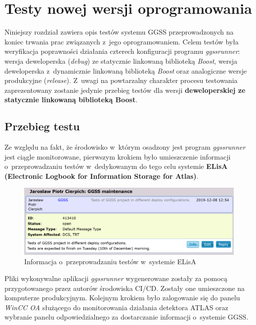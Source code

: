 \chapter{Testy nowej wersji oprogramowania}
\label{cha:test}
Niniejszy rozdział zawiera opis testów systemu GGSS przeprowadzonych na koniec trwania prac związanych z~jego oprogramowaniem. Celem testów była weryfikacja poprawności działania czterech konfiguracji programu \textit{ggssrunner}: wersja deweloperska (\textit{debug}) ze statycznie linkowaną biblioteką \textit{Boost}, wersja deweloperska z~dynamicznie linkowaną biblioteką \textit{Boost} oraz analogiczne wersje produkcyjne (\textit{release}). Z~uwagi na powtarzalny charakter procesu testowania zaprezentowany zostanie jedynie przebieg testów dla wersji \textbf{deweloperskiej ze statycznie linkowaną biblioteką Boost}. 

\section{Przebieg testu}
Ze względu na fakt, że środowisko w~którym osadzony jest program \textit{ggssrunner} jest ciągle monitorowane, pierwszym krokiem było umieszczenie informacji o~przeprowadzaniu testów w~dedykowanym do tego celu systemie \textbf{ELisA (Electronic Logbook for Information Storage for Atlas)}.

\begin{figure}[H]
\centering
\caption{Informacja o~przeprowadzaniu testów w~systemie ELisA}
\label{fig:elisa}
\includegraphics[width=\textwidth]{res/png/elisa}
\end{figure}

Pliki wykonywalne aplikacji \textit{ggssrunner} wygenerowane zostały za pomocą przygotowanego przez autorów środowiska CI/CD. Zostały one umieszczone na komputerze produkcyjnym. Kolejnym krokiem było zalogowanie się do panelu \textit{WinCC OA} służącego do monitorowania działania detektora ATLAS oraz wybranie panelu odpowiedzialnego za dostarczanie informacji o~systemie GGSS. 

